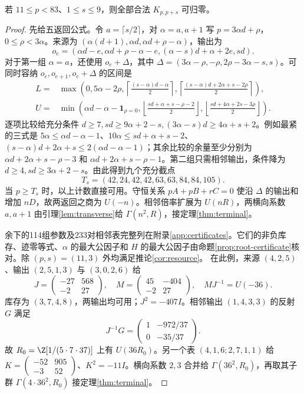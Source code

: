 \begin{lemma}\label{lem:small-supply}
若 $11\le p<83$、$1\le s\le9$，则全部合法 $K_{p,p+s}$ 可归零。
\end{lemma}
\begin{proof}
先给五返回公式。令 $a=\lceil s/2\rceil$，对 $\alpha=a,a+1$ 写 $p=3\alpha d+\rho$，$0\le\rho<3\alpha$。来源为 $(\alpha(d+1),\alpha d,\alpha d+\rho-\alpha)$，输出为
\[
o_e=(\alpha d-e,\alpha d+\rho-\alpha-e,(\alpha-s)d+\alpha+2e,sd).
\]
对于第一组 $\alpha=a$，还使用 $o_e+\Delta$，其中 $\Delta=(3\alpha-\rho,-\rho,2\rho-3\alpha-s,s)$。可同时容纳 $o_e,o_{e+1},o_e+\Delta$ 的区间是
\begin{align*}
L={}&\max\left(0,5\alpha-2\rho,
\left\lceil\frac{(s-\alpha)d-\alpha}{2}\right\rceil,
\left\lceil\frac{(s-\alpha)d+2\alpha+s-2\rho}{2}\right\rceil\right),\\
U={}&\min\left(\alpha d-\alpha-\mathbf1_{\rho=0},
\left\lfloor\frac{sd+\alpha+s-\rho-2}{2}\right\rfloor,
\left\lfloor\frac{sd+4\alpha+2s-3\rho}{2}\right\rfloor\right).
\end{align*}
逐项比较给充分条件 $d\ge7,sd\ge9\alpha+2-s,(3\alpha-s)d\ge4\alpha+s+2$。例如最紧的三式是 $5\alpha\le\alpha d-\alpha-1$、$10\alpha\le sd+\alpha+s-2$、$(s-\alpha)d+2\alpha+s\le2(\alpha d-\alpha-1)$；其余比较的余量至少分别为 $\alpha d+2\alpha+s-\rho-3$ 和 $\alpha d+2\alpha+s-\rho-1$。第二组只需相邻输出，条件降为 $d\ge4,sd\ge3\alpha+2-s$。由此得到九个充分截点
\[
T_s=(42,24,42,42,63,63,84,84,105).
\]
当 $p\ge T_s$ 时，以上计数直接可用。守恒关系 $pA+pB+rC=0$ 使沿 $\Delta$ 的输出和增加 $nD$，故两返回之商为 $U(-n)$。相邻倍率扩展为 $U(nR)$，两横向系数 $a,a+1$ 由引理\ref{lem:transverse}给 $\Gamma(n^2,R)$，接定理\ref{thm:terminal}。

余下的114组参数及233对相邻表完整列在附录\ref{app:certificates}。它们的非负库存、迹零等式、$\alpha$ 的最大公因子和 $H$ 的最大公因子由命题\ref{prop:root-certificate}核对。除 $(p,s)=(11,3)$ 外均满足推论\ref{cor:resource}。
在此例，来源 $(4,2,5)$、输出 $(2,5,1,3)$ 与 $(3,0,2,6)$ 给
\[
J=\begin{pmatrix}-27&568\\-2&27\end{pmatrix},\quad
M=\begin{pmatrix}45&-404\\-2&27\end{pmatrix},\quad MJ^{-1}=U(-36).
\]
库存为 $(3,7,4,8)$，两输出均可用；$J^2=-407I$。相邻输出 $(1,4,3,3)$ 的反射 $G$ 满足
\[J^{-1}G=\begin{pmatrix}1&-972/37\\0&-35/37\end{pmatrix}.
\]
故 $R_0=\Z[1/(5\cdot7\cdot37)]$ 上有 $U(36R_0)$。另一个表 $(4,1,6;2,7,1,1)$ 给 $K=\left(\begin{smallmatrix}-52&905\\-3&52\end{smallmatrix}\right)$、$K^2=-11I$。横向系数 $2,3$ 合并给 $\Gamma(36^2,R_0)$，再取其子群 $\Gamma(4\cdot36^2,R_0)$ 接定理\ref{thm:terminal}。
\end{proof}

